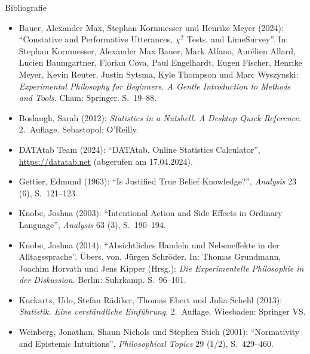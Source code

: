 \documentclass[xcolor=table,9pt,aspectratio=169]{beamer}
\begin{document}
\begin{frame}{\vspace*{10mm}Bibliografie}
\vspace*{-5mm}
{\footnotesize
\begin{itemize}[label=,leftmargin=2em,itemindent=-2em]
   \item Bauer, Alexander Max, Stephan Kornmesser und Henrike Meyer (2024): \enquote{Constative and Performative Utterances, $\chi^2$ Tests, and LimeSurvey}. In: Stephan Kornmesser, Alexander Max Bauer, Mark Alfano, Aurélien Allard, Lucien Baumgartner, Florian Cova, Paul Engelhardt, Eugen Fischer, Henrike Meyer, Kevin Reuter, Justin Sytsma, Kyle Thompson und Marc Wyszynski: \textit{Experimental Philosophy for Beginners. A Gentle Introduction to Methods and Tools}. Cham: Springer. S.~19--88.
   \item Boslaugh, Sarah (2012): \textit{Statistics in a Nutshell. A Desktop Quick Reference}. 2.~Auflage. Sebastopol: O'Reilly.
   \item DATAtab Team (2024): \enquote{DATAtab. Online Statistics Calculator}, \url{https://datatab.net} (abgerufen am 17.04.2024).
   \item Gettier, Edmund (1963): \enquote{Is Justified True Belief Knowledge?}, \textit{Analysis} 23 (6), S.~121--123.
   \item Knobe, Joshua (2003): \enquote{Intentional Action and Side Effects in Ordinary Language}, \textit{Analysis} 63 (3), S.~190--194.
   \item Knobe, Joshua (2014): \enquote{Absichtliches Handeln und Nebeneffekte in der Alltagssprache}. Übers. von. Jürgen Schröder. In: Thomas Grundmann, Joachim Horvath und Jens Kipper (Hrsg.): \textit{Die Experimentelle Philosophie in der Diskussion}. Berlin: Suhrkamp. S.~96--101.
   \item Kuckartz, Udo, Stefan Rädiker, Thomas Ebert und Julia Schehl (2013): \textit{Statistik. Eine verständliche Einführung}. 2.~Auflage. Wiesbaden: Springer VS.
   \item Weinberg, Jonathan, Shaun Nichols und Stephen Stich (2001): \enquote{Normativity and Epistemic Intuitions}, \textit{Philosophical Topics} 29 (1/2), S.~429--460.
\end{itemize}
}
\end{frame}
\end{document}
